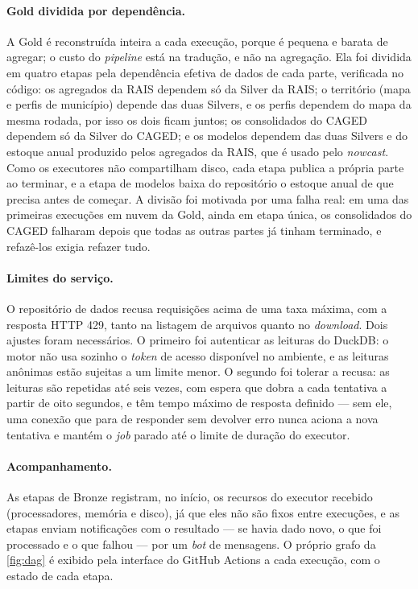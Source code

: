 \paragraph{Gold dividida por dependência.} A Gold é reconstruída inteira a cada execução, porque é pequena e barata de agregar; o custo do \textit{pipeline} está na tradução, e não na agregação. Ela foi dividida em quatro etapas pela dependência efetiva de dados de cada parte, verificada no código: os agregados da RAIS dependem só da Silver da RAIS; o território (mapa e perfis de município) depende das duas Silvers, e os perfis dependem do mapa da mesma rodada, por isso os dois ficam juntos; os consolidados do CAGED dependem só da Silver do CAGED; e os modelos dependem das duas Silvers e do estoque anual produzido pelos agregados da RAIS, que é usado pelo \textit{nowcast}. Como os executores não compartilham disco, cada etapa publica a própria parte ao terminar, e a etapa de modelos baixa do repositório o estoque anual de que precisa antes de começar. A divisão foi motivada por uma falha real: em uma das primeiras execuções em nuvem da Gold, ainda em etapa única, os consolidados do CAGED falharam depois que todas as outras partes já tinham terminado, e refazê-los exigia refazer tudo.

\paragraph{Limites do serviço.} O repositório de dados recusa requisições acima de uma taxa máxima, com a resposta HTTP 429, tanto na listagem de arquivos quanto no \textit{download}. Dois ajustes foram necessários. O primeiro foi autenticar as leituras do DuckDB: o motor não usa sozinho o \textit{token} de acesso disponível no ambiente, e as leituras anônimas estão sujeitas a um limite menor. O segundo foi tolerar a recusa: as leituras são repetidas até seis vezes, com espera que dobra a cada tentativa a partir de oito segundos, e têm tempo máximo de resposta definido --- sem ele, uma conexão que para de responder sem devolver erro nunca aciona a nova tentativa e mantém o \textit{job} parado até o limite de duração do executor.

\paragraph{Acompanhamento.} As etapas de Bronze registram, no início, os recursos do executor recebido (processadores, memória e disco), já que eles não são fixos entre execuções, e as etapas enviam notificações com o resultado --- se havia dado novo, o que foi processado e o que falhou --- por um \textit{bot} de mensagens. O próprio grafo da \autoref{fig:dag} é exibido pela interface do GitHub Actions a cada execução, com o estado de cada etapa.


